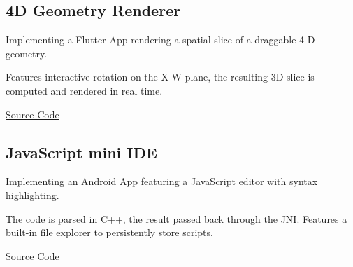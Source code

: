 \documentclass{article}
\begin{document}
\begin{paracol}{2}
\subsection{4D Geometry Renderer}
Implementing a Flutter App rendering a spatial slice of a draggable 4-D geometry.

Features interactive rotation on the X-W plane, the resulting 3D slice is computed and rendered in real time.

\href{https://github.com/Jim-Eckerlein/pentachoron}{\underline{Source Code}}

\subsection{JavaScript mini IDE}
Implementing an Android App featuring a JavaScript editor with syntax highlighting.

The code is parsed in C++, the result passed back through the JNI. Features a built-in file explorer to persistently store scripts.

\href{https://github.com/Jim-Eckerlein/javascript-mini-ide}{\underline{Source Code}}

\end{paracol}
\end{document}
